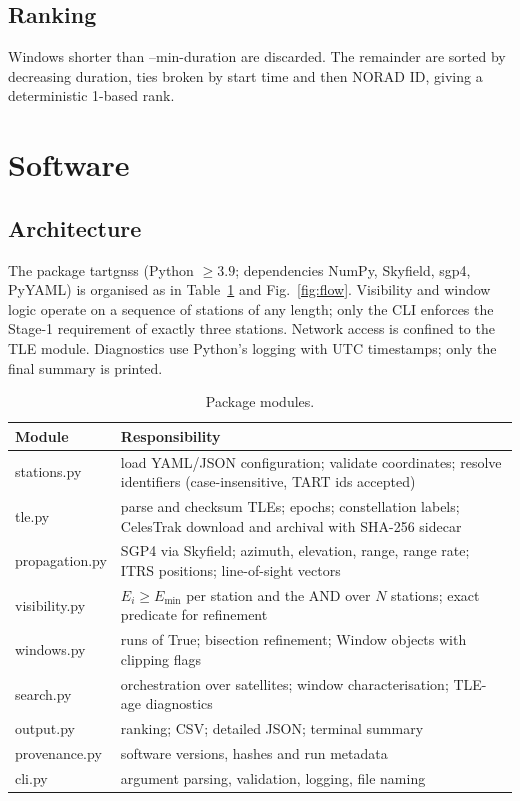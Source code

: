 \documentclass[11pt,a4paper]{article}
\newcommand{\code}[1]{{\ttfamily\def\_{\textunderscore\allowbreak}#1}}
\begin{document}
\subsection{Ranking}

Windows shorter than \code{--min-duration} are discarded. The remainder are
sorted by decreasing duration, ties broken by start time and then NORAD ID,
giving a deterministic 1-based rank.

\section{Software}

\subsection{Architecture}

The package \code{tart\_gnss} (Python $\ge 3.9$; dependencies NumPy,
Skyfield, sgp4, PyYAML) is organised as in Table~\ref{tab:modules} and
Fig.~\ref{fig:flow}. Visibility and window logic operate on a sequence of
stations of any length; only the CLI enforces the Stage-1 requirement of
exactly three stations. Network access is confined to the TLE module.
Diagnostics use Python's \code{logging} with UTC timestamps; only the final
summary is printed.

\begin{table}[h]
\centering
\caption{Package modules.}
\label{tab:modules}
\small
\begin{tabular}{lp{11cm}}
\toprule
Module & Responsibility\\
\midrule
\code{stations.py} & load YAML/JSON configuration; validate coordinates; resolve identifiers (case-insensitive, TART ids accepted)\\
\code{tle.py} & parse and checksum TLEs; epochs; constellation labels; CelesTrak download and archival with SHA-256 sidecar\\
\code{propagation.py} & SGP4 via Skyfield; azimuth, elevation, range, range rate; ITRS positions; line-of-sight vectors\\
\code{visibility.py} & $E_i\ge E_{\min}$ per station and the AND over $N$ stations; exact predicate for refinement\\
\code{windows.py} & runs of \code{True}; bisection refinement; \code{Window} objects with clipping flags\\
\code{search.py} & orchestration over satellites; window characterisation; TLE-age diagnostics\\
\code{output.py} & ranking; CSV; detailed JSON; terminal summary\\
\code{provenance.py} & software versions, hashes and run metadata\\
\code{cli.py} & argument parsing, validation, logging, file naming\\
\bottomrule
\end{tabular}
\end{table}
\end{document}
